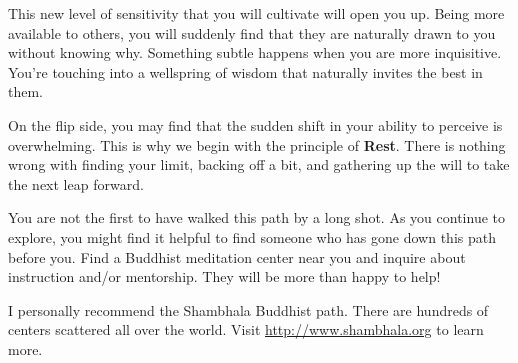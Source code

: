 This new level of sensitivity that you will cultivate will open you up. Being more available to others, you
will suddenly find that they are naturally drawn to you without knowing why. Something subtle happens when
you are more inquisitive. You're touching into a wellspring of wisdom that naturally invites the best in them.

On the flip side, you may find that the sudden shift in your ability to perceive is overwhelming. This is why
we begin with the principle of \textbf{Rest}. There is nothing wrong with finding your limit, backing off a bit, 
and gathering up the will to take the next leap forward. 

You are not the first to have walked this path by a long shot. As you continue to explore, you might find
it helpful to find someone who has gone down this path before you. Find a Buddhist meditation center near
you and inquire about instruction and/or mentorship. They will be more than happy to help!

I personally recommend the Shambhala Buddhist path. There are hundreds of centers scattered all over
the world. Visit \url{http://www.shambhala.org} to learn more.










